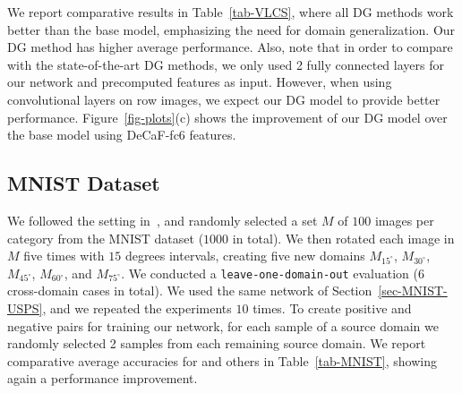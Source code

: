 We report comparative results in Table~\ref{tab-VLCS}, where all DG methods work better than the base model, emphasizing the need for domain generalization. Our DG method has higher average performance. Also, note that in order to compare with the state-of-the-art DG methods, we only used 2 fully connected layers for our network and precomputed features as input. However, when using convolutional layers on row images, we expect our DG model to provide better performance. Figure~\ref{fig-plots}(c) shows the improvement of our DG model over the base model using DeCaF-fc6 features.

\subsection{MNIST Dataset}
We followed the setting in~\cite{ghifary2015domain}, and randomly selected a set $M$ of $100$ images per category from the MNIST dataset ($1000$ in total). We then rotated each image in $M$ five times with $15$ degrees intervals, creating five new domains $M_{15^{\circ}}$, $M_{30^{\circ}}$, $M_{45^{\circ}}$, $M_{60^{\circ}}$, and $M_{75^{\circ}}$. We conducted a {\tt leave-one-domain-out} evaluation ($6$ cross-domain cases in total). We used the same network of Section~\ref{sec-MNIST-USPS}, and we repeated the experiments $10$ times. To create positive and
negative pairs for training our network, for each sample of a
source domain we randomly selected 2 samples from each
remaining source domain. We report comparative average accuracies for \modelGA and others in Table~\ref{tab-MNIST}, showing again a performance improvement.


